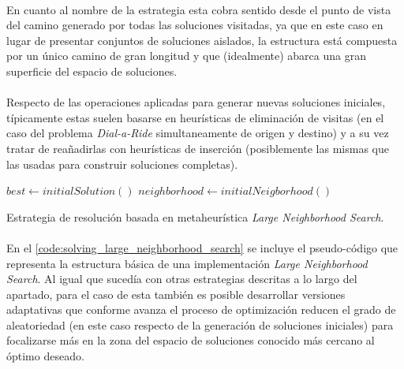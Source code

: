 \documentclass{subfiles}
\begin{document}
        \paragraph{}
        En cuanto al nombre de la estrategia esta cobra sentido desde el punto de vista del camino generado por todas las soluciones visitadas, ya que en este caso en lugar de presentar conjuntos de soluciones aislados, la estructura está compuesta por un único camino de gran longitud y que (idealmente) abarca una gran superficie del espacio de soluciones. 

        \paragraph{}
        Respecto de las operaciones aplicadas para generar nuevas soluciones iniciales, típicamente estas suelen basarse en heurísticas de eliminación de visitas (en el caso del problema \emph{Dial-a-Ride} simultaneamente de origen y destino) y a su vez tratar de reañadirlas con heurísticas de inserción (posiblemente las mismas que las usadas para construir soluciones completas).

        \begin{algorithm}[ht]
          \SetAlgoLined
          $best \gets initialSolution()$\;
          $neighborhood \gets initialNeigborhood()$\;
          \caption{Estrategia de resolución basada en metaheurística \emph{Large Neighborhood Search}.}
          \label{code:solving_large_neighborhood_search}
        \end{algorithm}

        \paragraph{}
        En el \cref{code:solving_large_neighborhood_search} se incluye el pseudo-código que representa la estructura básica de una implementación \emph{Large Neighborhood Search}. Al igual que sucedía con otras estrategias descritas a lo largo del apartado, para el caso de esta también es posible desarrollar versiones adaptativas que conforme avanza el proceso de optimización reducen el grado de aleatoriedad (en este caso respecto de la generación de soluciones iniciales) para focalizarse más en la zona del espacio de soluciones conocido más cercano al óptimo deseado.
\end{document}
